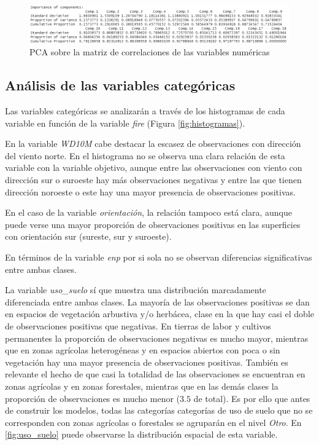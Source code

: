 \documentclass[12pt,a4paper,]{book}
\numberwithin{dummy}{section}
\theoremstyle{ocrenumbox}
\theoremstyle{blacknumex}
\theoremstyle{blacknumbox}
\theoremstyle{ocrenum}
\theoremstyle{ocrenum}
\begin{document}
\begin{figure}[h]
\centering
\includegraphics[width =\textwidth]{graficos/pca.png}
\caption{PCA sobre la matriz de correlaciones de las variables numéricas}
\label{fig:PCA}
\end{figure}

\hypertarget{anuxe1lisis-de-las-variables-categuxf3ricas}{%
\subsection{Análisis de las variables
categóricas}\label{anuxe1lisis-de-las-variables-categuxf3ricas}}

Las variables categóricas se analizarán a través de los histogramas de
cada variable en función de la variable \emph{fire} (Figura
\ref{fig:histogramas}).

En la variable \emph{WD10M} cabe destacar la escasez de observaciones
con dirección del viento norte. En el histograma no se observa una clara
relación de esta variable con la variable objetivo, aunque entre las
observaciones con viento con dirección sur o suroeste hay más
observaciones negativas y entre las que tienen dirección noroeste o este
hay una mayor presencia de observaciones positivas.

En el caso de la variable \emph{orientación}, la relación tampoco está
clara, aunque puede verse una mayor proporción de observaciones
positivas en las superficies con orientación sur (sureste, sur y
suroeste).

En términos de la variable \emph{enp} por si sola no se observan
diferencias significativas entre ambas clases.

La variable \emph{uso\_suelo} sí que muestra una distribución
marcadamente diferenciada entre ambas clases. La mayoría de las
observaciones positivas se dan en espacios de vegetación arbustiva y/o
herbácea, clase en la que hay casi el doble de observaciones positivas
que negativas. En tierras de labor y cultivos permanentes la proporción
de observaciones negativas es mucho mayor, mientras que en zonas
agrícolas heterogéneas y en espacios abiertos con poca o sin vegetación
hay una mayor presencia de observaciones positivas. También es relevante
el hecho de que casi la totalidad de las observaciones se encuentran en
zonas agrícolas y en zonas forestales, mientras que en las demás clases
la proporción de observaciones es mucho menor (\(3.5%
\) de total). Es por ello que antes de construir los modelos, todas las
categorías categorías de uso de suelo que no se corresponden con zonas
agrícolas o forestales se agruparán en el nivel \emph{Otro}. En
\ref{fig:uso_suelo} puede observarse la distribución espacial de esta
variable.
\end{document}
